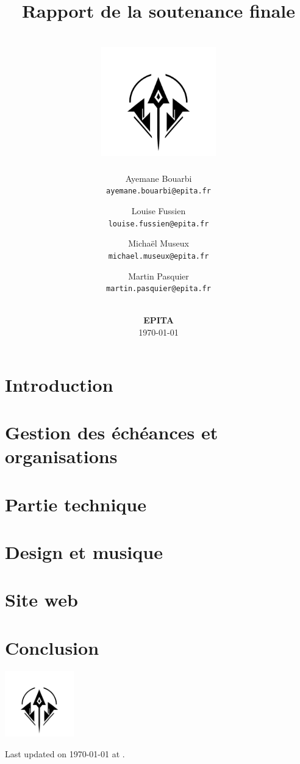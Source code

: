 \documentclass[12pt]{article}
\title{
    Rapport de la soutenance finale \\
    \textbf{\gameName} \\
    \vspace{0.5cm}
    \includegraphics[width=5cm]{assets/logo.png}
    \vspace{3.7cm}
}
\author{
    Ayemane Bouarbi \\
    \texttt{ayemane.bouarbi@epita.fr}
    \vspace{0.5cm}\and
    Louise Fussien \\
    \texttt{louise.fussien@epita.fr}
    \vspace{0.5cm}\and
    Michaël Museux \\
    \texttt{michael.museux@epita.fr}
    \vspace{0.5cm}\and
    Martin Pasquier \\
    \texttt{martin.pasquier@epita.fr}
}
\date{
    \vspace{1.5cm}
    \textbf{\companyName} \\
    \vspace{0.3cm}
    \textbf{EPITA} \\
    \vspace{1.3cm}
    \today
}
\begin{document}
\begin{titlepage}
    \maketitle
    \thispagestyle{empty} %
\end{titlepage}

\newpage
\thispagestyle{empty}
\mbox{}

\newpage
\tableofcontents

\newpage
\section{Introduction}


\newpage
\section{Gestion des échéances et organisations}


\newpage
\section{Partie technique}


\newpage
\section{Design et musique}


\newpage
\section{Site web}


\newpage
\section{Conclusion}




\centering
\vspace*{1.8cm}
\includegraphics[width=3cm]{assets/logo.png}

\vspace*{1cm}
Last updated on \today{} at \currenttime.
\end{document}
